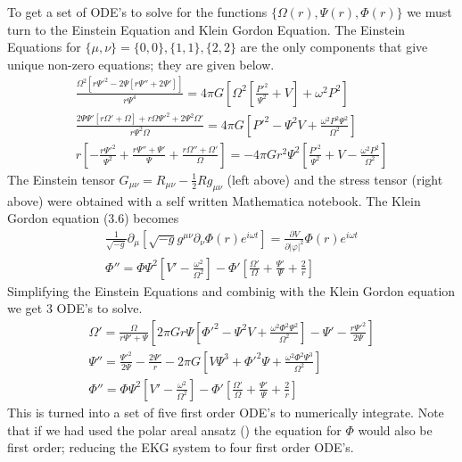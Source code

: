 \documentclass[11pt, oneside]{report}  %
\newcommand{\vp}{\varphi}
\numberwithin{equation}{section}
\begin{document}
To get a set of ODE's to solve for the functions $\{\Omega(r), \Psi(r),\Phi(r)\}$ we must turn to the Einstein Equation and Klein Gordon Equation. The Einstein Equations for $\{\mu,\nu\}=\{0,0\},\{1,1\},\{2,2\}$ are the only components that give unique non-zero equations; they are given below.
\begin{gather}
\frac{\Omega ^2 \left[r \Psi '^2-2 \Psi  \left[r \Psi ''+2 \Psi '\right]\right]}{r \Psi ^4} = 4\pi G \left[\Omega ^2 \left[\frac{P'^2}{\Psi ^2}+V\right]+\omega ^2 P^2\right]\\
\frac{2 \Psi  \Psi ' \left[r \Omega '+\Omega \right]+r \Omega  \Psi '^2+2 \Psi ^2 \Omega
   '}{r \Psi ^2 \Omega } = 4\pi G \left[P'^2-\Psi ^2 V+\frac{\omega ^2 P^2 \Psi ^2}{\Omega
   ^2}\right]\\
   r \left[-\frac{r \Psi '^2}{\Psi ^2}+\frac{r \Psi ''+\Psi '}{\Psi }+\frac{r \Omega ''+\Omega
   '}{\Omega }\right] = -4\pi G r^2 \Psi ^2 \left[\frac{P'^2}{\Psi ^2}+V-\frac{\omega ^2 P^2}{\Omega
   ^2}\right]
   \end{gather}
  The Einstein tensor $G_{\mu\nu} = R_{\mu\nu}-\frac{1}{2}R g_{\mu\nu}$ (left above) and the stress tensor (right above) were obtained with a self written Mathematica notebook. The Klein Gordon equation (3.6) becomes
  \begin{gather*} \frac{1}{\sqrt{-g}}\partial_\mu \left[ \sqrt{-g}g^{\mu\nu}\partial_\nu \Phi(r)e^{i\omega t}\right] = \frac{\partial V}{\partial |\vp|^2} \Phi(r)e^{i\omega t} \\
  \Phi'' = \Phi\Psi^2\left[V'-\frac{\omega^2}{\Omega^2}\right] - \Phi'\left[\frac{\Omega'}{\Omega} +\frac{\Psi'}{\Psi}+\frac{2}{r} \right]\end{gather*}
Simplifying the Einstein Equations and combinig with the Klein Gordon equation we get 3 ODE's to solve.
\begin{gather}\Omega '=\frac{\Omega}{r\Psi'+\Psi}\left[2 \pi  G r \Psi \left[\Phi'^2 -\Psi^2 
   V+\frac{\omega ^2 \Phi^2 \Psi^2}{\Omega^2} \right]  -\Psi '-\frac{r \Psi '^2}{2 \Psi} \right]
\\{ \Psi'' = \frac{\Psi'^2}{2\Psi} - \frac{2\Psi'}{r}-2\pi G \left[V \Psi^3 + \Phi'^2\Psi+ \frac{ \omega^2\Phi^2\Psi^3}{\Omega^2}\right] }
\\ \Phi'' = \Phi\Psi^2\left[V'-\frac{\omega^2}{\Omega^2}\right] - \Phi'\left[\frac{\Omega'}{\Omega} +\frac{\Psi'}{\Psi}+\frac{2}{r} \right]\end{gather}
This is turned into a set of five first order ODE's to numerically integrate. Note that if we had used the polar areal ansatz () the equation for $\Phi$ would also be first order; reducing the EKG system to four first order ODE's.
\end{document}

